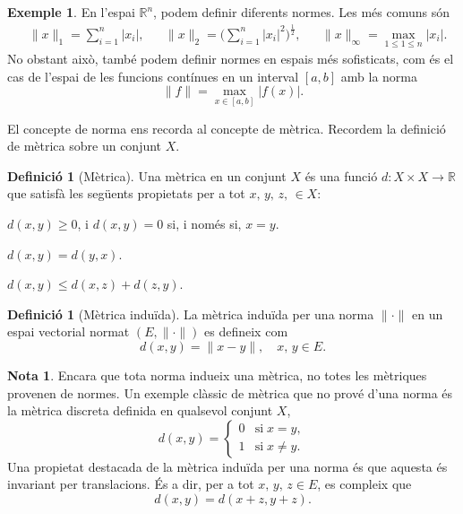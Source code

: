 \documentclass[12pt]{book}
\theoremstyle{definition}
\newtheorem{defi}[teorema]{Definició}
\theoremstyle{nota}
\newtheorem{nota}[teorema]{Nota}
\theoremstyle{exemple}
\newtheorem{exemple}[teorema]{Exemple}
\begin{document}
\begin{exemple}
  En l'espai $\mathbb{R}^n$, podem definir diferents normes. Les més
  comuns són
  \begin{align*}
    &\|x\|_1 = \sum_{i=1}^n|x_i|, &
    &\|x\|_2 = \Big( \sum_{i=1}^{n} |x_i|^2 \Big)^{\frac{1}{2}}, &
    &\|x\|_\infty = \max_{1 \leq 1 \leq n} |x_i|.
  \end{align*}
  No obstant això, també podem definir normes en espais més
  sofisticats, com és el cas de l'espai de les funcions contínues en
  un interval $[a,b]$ amb la norma
  \[
    \|f\| = \max_{x \in [a,b]} |f(x)|.
  \]
\end{exemple}

El concepte de norma ens recorda al concepte de mètrica. Recordem la
definició de mètrica sobre un conjunt $X$.

\begin{defi}[Mètrica]
  Una mètrica en un conjunt $X$ és una funció
  $d : X \times X \to \mathbb{R}$ que satisfà les següents propietats
  per a tot $x, \, y, \, z, \, \in X$:
  \begin{description}[noitemsep]
  \item[Positivitat] $d(x,y) \geq 0$, i $d(x,y) = 0$ si, i només si, $x = y$.
  \item[Simetria] $d(x,y) = d(y,x)$.
  \item[Desigualtat triangular] $d(x,y) \leq d(x,z) + d(z,y)$.
  \end{description}
\end{defi}

\begin{defi}[Mètrica induïda]
  La mètrica induïda per una norma $\|\cdot\|$ en un espai vectorial
  normat $(E, \|\cdot\|)$ es defineix com
  \[
    d(x,y) = \|x - y\|, \quad x,\, y \in E.
  \]
\end{defi}

\begin{nota}
  Encara que tota norma indueix una mètrica, no totes les mètriques
  provenen de normes. Un exemple clàssic de mètrica que no prové d'una
  norma és la mètrica discreta definida en qualsevol conjunt $X$,
  \[
    d(x,y) =
    \begin{cases}
      0 & \text{si}\; x = y, \\
      1 & \text{si}\; x \neq y.
    \end{cases}
  \]
  Una propietat destacada de la mètrica induïda per una norma és que
  aquesta és invariant per translacions. És a dir, per a tot
  $x,\, y,\, z \in E$, es compleix que
  \[
    d(x,y) = d(x+z, y+z).
  \]
\end{nota}
\end{document}
